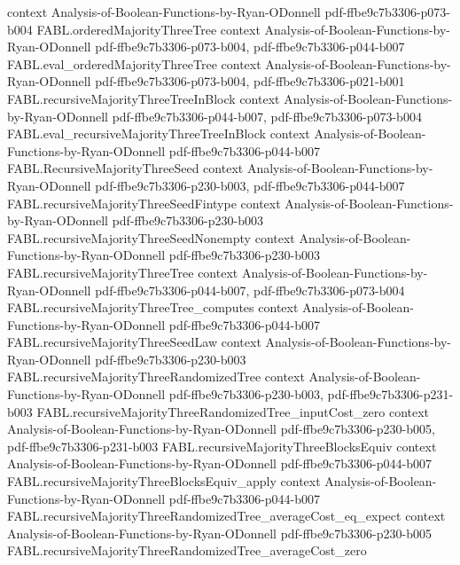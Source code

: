 \begin{theorem}
  {context}
  {Analysis-of-Boolean-Functions-by-Ryan-ODonnell}
  {pdf-ffbe9c7b3306-p073-b004}
\proofstep
  {FABL.orderedMajorityThreeTree}
  {context}
  {Analysis-of-Boolean-Functions-by-Ryan-ODonnell}
  {pdf-ffbe9c7b3306-p073-b004,
    pdf-ffbe9c7b3306-p044-b007}
\proofstep
  {FABL.eval_orderedMajorityThreeTree}
  {context}
  {Analysis-of-Boolean-Functions-by-Ryan-ODonnell}
  {pdf-ffbe9c7b3306-p073-b004,
    pdf-ffbe9c7b3306-p021-b001}
\proofstep
  {FABL.recursiveMajorityThreeTreeInBlock}
  {context}
  {Analysis-of-Boolean-Functions-by-Ryan-ODonnell}
  {pdf-ffbe9c7b3306-p044-b007,
    pdf-ffbe9c7b3306-p073-b004}
\proofstep
  {FABL.eval_recursiveMajorityThreeTreeInBlock}
  {context}
  {Analysis-of-Boolean-Functions-by-Ryan-ODonnell}
  {pdf-ffbe9c7b3306-p044-b007}
\proofstep
  {FABL.RecursiveMajorityThreeSeed}
  {context}
  {Analysis-of-Boolean-Functions-by-Ryan-ODonnell}
  {pdf-ffbe9c7b3306-p230-b003,
    pdf-ffbe9c7b3306-p044-b007}
\proofstep
  {FABL.recursiveMajorityThreeSeedFintype}
  {context}
  {Analysis-of-Boolean-Functions-by-Ryan-ODonnell}
  {pdf-ffbe9c7b3306-p230-b003}
\proofstep
  {FABL.recursiveMajorityThreeSeedNonempty}
  {context}
  {Analysis-of-Boolean-Functions-by-Ryan-ODonnell}
  {pdf-ffbe9c7b3306-p230-b003}
\proofstep
  {FABL.recursiveMajorityThreeTree}
  {context}
  {Analysis-of-Boolean-Functions-by-Ryan-ODonnell}
  {pdf-ffbe9c7b3306-p044-b007,
    pdf-ffbe9c7b3306-p073-b004}
\proofstep
  {FABL.recursiveMajorityThreeTree_computes}
  {context}
  {Analysis-of-Boolean-Functions-by-Ryan-ODonnell}
  {pdf-ffbe9c7b3306-p044-b007}
\proofstep
  {FABL.recursiveMajorityThreeSeedLaw}
  {context}
  {Analysis-of-Boolean-Functions-by-Ryan-ODonnell}
  {pdf-ffbe9c7b3306-p230-b003}
\proofstep
  {FABL.recursiveMajorityThreeRandomizedTree}
  {context}
  {Analysis-of-Boolean-Functions-by-Ryan-ODonnell}
  {pdf-ffbe9c7b3306-p230-b003,
    pdf-ffbe9c7b3306-p231-b003}
\proofstep
  {FABL.recursiveMajorityThreeRandomizedTree_inputCost_zero}
  {context}
  {Analysis-of-Boolean-Functions-by-Ryan-ODonnell}
  {pdf-ffbe9c7b3306-p230-b005,
    pdf-ffbe9c7b3306-p231-b003}
\proofstep
  {FABL.recursiveMajorityThreeBlocksEquiv}
  {context}
  {Analysis-of-Boolean-Functions-by-Ryan-ODonnell}
  {pdf-ffbe9c7b3306-p044-b007}
\proofstep
  {FABL.recursiveMajorityThreeBlocksEquiv_apply}
  {context}
  {Analysis-of-Boolean-Functions-by-Ryan-ODonnell}
  {pdf-ffbe9c7b3306-p044-b007}
\proofstep
  {FABL.recursiveMajorityThreeRandomizedTree_averageCost_eq_expect}
  {context}
  {Analysis-of-Boolean-Functions-by-Ryan-ODonnell}
  {pdf-ffbe9c7b3306-p230-b005}
\proofstep
  {FABL.recursiveMajorityThreeRandomizedTree_averageCost_zero}

\end{theorem}
